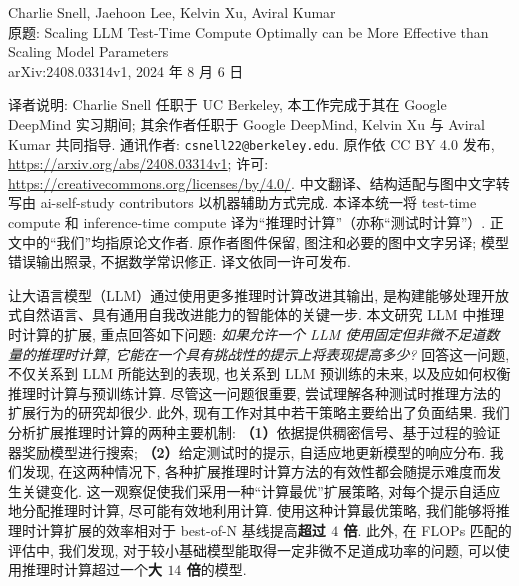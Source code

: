 \label{testcompute-chapter}
\begin{center}
Charlie Snell, Jaehoon Lee, Kelvin Xu, Aviral Kumar\\
原题: Scaling LLM Test-Time Compute Optimally can be More Effective than Scaling Model Parameters\\
arXiv:2408.03314v1, 2024 年 8 月 6 日
\end{center}
\begin{remark}
译者说明: Charlie Snell 任职于 UC Berkeley, 本工作完成于其在 Google DeepMind 实习期间; 其余作者任职于 Google DeepMind, Kelvin Xu 与 Aviral Kumar 共同指导. 通讯作者: \texttt{csnell22@berkeley.edu}. 原作依 CC BY 4.0 发布, \url{https://arxiv.org/abs/2408.03314v1}; 许可: \url{https://creativecommons.org/licenses/by/4.0/}. 中文翻译、结构适配与图中文字转写由 ai-self-study contributors 以机器辅助方式完成. 本译本统一将 test-time compute 和 inference-time compute 译为“推理时计算”（亦称“测试时计算”）. 正文中的“我们”均指原论文作者. 原作者图件保留, 图注和必要的图中文字另译; 模型错误输出照录, 不据数学常识修正. 译文依同一许可发布. 
\end{remark}

\label{testcompute-abstract}
让大语言模型（LLM）通过使用更多推理时计算改进其输出, 是构建能够处理开放式自然语言、具有通用自我改进能力的智能体的关键一步. 本文研究 LLM 中推理时计算的扩展, 重点回答如下问题: \emph{如果允许一个 LLM 使用固定但非微不足道数量的推理时计算, 它能在一个具有挑战性的提示上将表现提高多少? } 回答这一问题, 不仅关系到 LLM 所能达到的表现, 也关系到 LLM 预训练的未来, 以及应如何权衡推理时计算与预训练计算. 尽管这一问题很重要, 尝试理解各种测试时推理方法的扩展行为的研究却很少. 此外, 现有工作对其中若干策略主要给出了负面结果. 我们分析扩展推理时计算的两种主要机制: \textbf{（1）}依据提供稠密信号、基于过程的验证器奖励模型进行搜索; \textbf{（2）}给定测试时的提示, 自适应地更新模型的响应分布. 我们发现, 在这两种情况下, 各种扩展推理时计算方法的有效性都会随提示难度而发生关键变化. 这一观察促使我们采用一种“计算最优”扩展策略, 对每个提示自适应地分配推理时计算, 尽可能有效地利用计算. 使用这种计算最优策略, 我们能够将推理时计算扩展的效率相对于 best-of-N 基线提高\textbf{超过 $4$ 倍}. 此外, 在 FLOPs 匹配的评估中, 我们发现, 对于较小基础模型能取得一定非微不足道成功率的问题, 可以使用推理时计算超过一个\textbf{大 $14$ 倍}的模型. 

